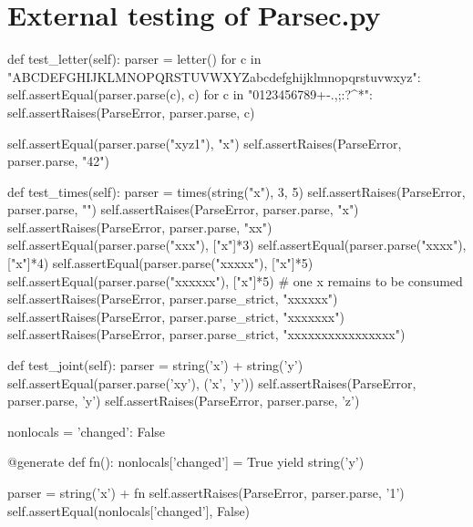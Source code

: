 \section{External testing of Parsec.py}


\begin{python}
def test_letter(self):
    parser = letter()
    for c in "ABCDEFGHIJKLMNOPQRSTUVWXYZabcdefghijklmnopqrstuvwxyz":
        self.assertEqual(parser.parse(c), c)
    for c in "0123456789+-.,;:?^*":
        self.assertRaises(ParseError, parser.parse, c)

    self.assertEqual(parser.parse("xyz1"), "x")
    self.assertRaises(ParseError, parser.parse, "42")
\end{python}

\begin{python}
def test_times(self):
    parser = times(string("x"), 3, 5)
    self.assertRaises(ParseError, parser.parse, "")
    self.assertRaises(ParseError, parser.parse, "x")
    self.assertRaises(ParseError, parser.parse, "xx")
    self.assertEqual(parser.parse("xxx"), ["x"]*3)
    self.assertEqual(parser.parse("xxxx"), ["x"]*4)
    self.assertEqual(parser.parse("xxxxx"), ["x"]*5)
    self.assertEqual(parser.parse("xxxxxx"), ["x"]*5) # one x remains to be consumed
    self.assertRaises(ParseError, parser.parse_strict, "xxxxxx")
    self.assertRaises(ParseError, parser.parse_strict, "xxxxxxx")
    self.assertRaises(ParseError, parser.parse_strict, "xxxxxxxxxxxxxxxx")
\end{python}



\begin{python}
def test_joint(self):
    parser = string('x') + string('y')
    self.assertEqual(parser.parse('xy'), ('x', 'y'))
    self.assertRaises(ParseError, parser.parse, 'y')
    self.assertRaises(ParseError, parser.parse, 'z')

    nonlocals = {'changed': False}

    @generate
    def fn():
        nonlocals['changed'] = True
        yield string('y')

    parser = string('x') + fn
    self.assertRaises(ParseError, parser.parse, '1')
    self.assertEqual(nonlocals['changed'], False)
\end{python}






